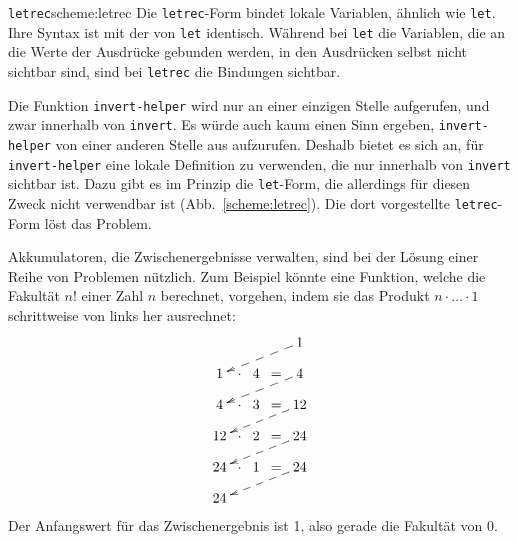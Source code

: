 \begin{feature}{\texttt{letrec}}{scheme:letrec}
Die \texttt{letrec}-Form bindet lokale Variablen, ähnlich wie \texttt{let}.
Ihre Syntax ist mit der von \texttt{let} identisch.  Während bei \texttt{let}
die Variablen, die an die Werte der Ausdrücke gebunden werden,
in den Ausdrücken selbst nicht sichtbar sind, sind bei \texttt{letrec}
die Bindungen sichtbar.  
\end{feature}

Die Funktion \texttt{invert-helper} wird nur an einer einzigen Stelle
aufgerufen, und zwar innerhalb von \texttt{invert}. Es würde auch kaum einen
Sinn ergeben, \texttt{invert-helper} von einer anderen Stelle aus
aufzurufen. Deshalb bietet es sich an, für \texttt{invert-helper} eine lokale
Definition zu verwenden, die nur innerhalb von \texttt{invert} sichtbar
ist. Dazu gibt es im Prinzip die \texttt{let}-Form, die allerdings für
diesen Zweck nicht verwendbar ist (Abb.~\ref{scheme:letrec}). Die dort
vorgestellte \texttt{letrec}-Form löst das Problem.

Akkumulatoren, die Zwischenergebnisse verwalten, sind bei der Lösung
einer Reihe von Problemen nützlich.  Zum Beispiel könnte eine
Funktion, welche die Fakultät $n!$ einer Zahl $n$ berechnet,
vorgehen, indem sie das Produkt $n \cdot \ldots \cdot 1$ schrittweise von
links her ausrechnet:
%
\begin{displaymath}
  \xymatrix@R=10pt@C=2pt{
      &       &   & & 1\ar@{-->}[dllll]\\
    1 & \cdot & 4 &=& 4\ar@{-->}[dllll]\\
    4 & \cdot & 3 &=& 12\ar@{-->}[dllll]\\
    12 & \cdot & 2 &=& 24\ar@{-->}[dllll]\\
    24 & \cdot & 1 &=& 24\ar@{-->}[dllll]\\
    24
    }
\end{displaymath}
%
Der Anfangswert für das Zwischenergebnis ist 1, also gerade die
Fakultät von 0.


